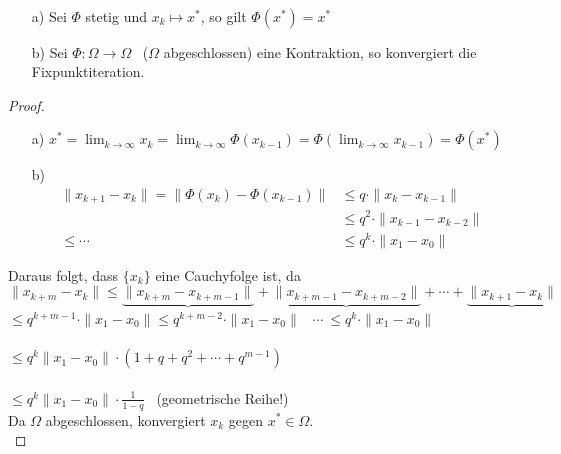 \begin{lemma}[Konvergenz]
~ %
\begin{enumerate}
\item[a)] Sei $\Phi$ stetig und $x_k \longmapsto x^*$, so gilt $\Phi(x^*)=x^*$
\item[b)] Sei $\Phi: \Omega \longrightarrow \Omega$ \ ($\Omega$ abgeschlossen) eine Kontraktion, so konvergiert die Fixpunktiteration.
\end{enumerate}
\end{lemma}

\begin{proof}
~
\begin{enumerate}
\item[a)] $x^*=\lim_{k \to \infty}x_k=\lim_{k \to \infty}\Phi(x_{k-1})=\Phi(\lim_{k \to \infty}x_{k-1})=\Phi(x^*)$
\item[b)]
\begin{align*}
\|x_{k+1}-x_k\| = \|\Phi(x_k)-\Phi(x_{k-1})\| &\leq q\cdot \|x_k-x_{k-1}\| \\
                                              &\leq q^2\cdot \|x_{k-1}-x_{k-2}\| \\
                                   \leq \cdots&\leq q^k\cdot \|x_1-x_0\|
\end{align*}
\end{enumerate}

Daraus folgt, dass $\{x_k\}$ eine Cauchyfolge ist, da
\\$\|x_{k+m}-x_k\|\leq \underbrace{\|x_{k+m}-x_{k+m-1}\|}+\underbrace{\|x_{k+m-1}-x_{k+m-2}\|}+\cdots +\underbrace{\|x_{k+1}-x_k\|}$
\\\hspace*{21mm}$\leq q^{k+m-1}\cdot \|x_1-x_0\|$\hspace*{3mm}$\leq q^{k+m-2}\cdot \|x_1-x_0\|$ \ $\cdots \ \leq q^k\cdot \|x_1-x_0\|$\\
\\\hspace*{21mm}$\leq q^k\|x_1-x_0\| \cdot (1+q+q^2+\cdots +q^{m-1})$\\
\\\hspace*{21mm}$\leq q^k\|x_1-x_0\| \cdot \frac{1}{1-q}$ \ (geometrische Reihe!)
\newline
\\Da $\Omega$ abgeschlossen, konvergiert $x_k$ gegen $x^* \in \Omega$.\\
\end{proof}

